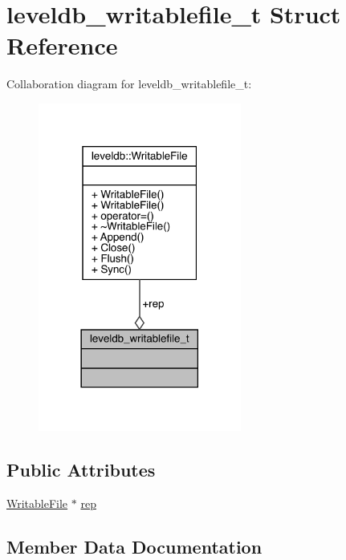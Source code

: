 \hypertarget{structleveldb__writablefile__t}{}\section{leveldb\+\_\+writablefile\+\_\+t Struct Reference}
\label{structleveldb__writablefile__t}


Collaboration diagram for leveldb\+\_\+writablefile\+\_\+t\+:
\nopagebreak
\begin{figure}[H]
\begin{center}
\leavevmode
\includegraphics[width=189pt]{structleveldb__writablefile__t__coll__graph}
\end{center}
\end{figure}
\subsection*{Public Attributes}
\begin{DoxyCompactItemize}
\item 
\mbox{\hyperlink{classleveldb_1_1_writable_file}{Writable\+File}} $\ast$ \mbox{\hyperlink{structleveldb__writablefile__t_a3cf7e2a9ac0560d667deee9d574d7761}{rep}}
\end{DoxyCompactItemize}


\subsection{Member Data Documentation}
\mbox{\label{structleveldb__writablefile__t_a3cf7e2a9ac0560d667deee9d574d7761}} 
